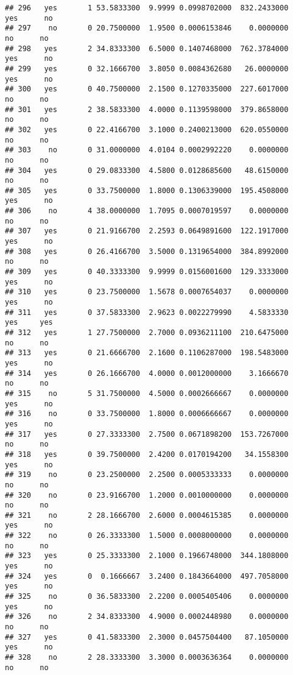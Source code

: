 \documentclass[]{article}
\begin{document}
\begin{verbatim}
## 296   yes       1 53.5833300  9.9999 0.0998702000  832.2433000   yes      no
## 297    no       0 20.7500000  1.9500 0.0006153846    0.0000000    no      no
## 298   yes       2 34.8333300  6.5000 0.1407468000  762.3784000   yes      no
## 299   yes       0 32.1666700  3.8050 0.0084362680   26.0000000   yes      no
## 300   yes       0 40.7500000  2.1500 0.1270335000  227.6017000    no      no
## 301   yes       2 38.5833300  4.0000 0.1139598000  379.8658000    no      no
## 302   yes       0 22.4166700  3.1000 0.2400213000  620.0550000    no      no
## 303    no       0 31.0000000  4.0104 0.0002992220    0.0000000    no      no
## 304   yes       0 29.0833300  4.5800 0.0128685600   48.6150000    no      no
## 305   yes       0 33.7500000  1.8000 0.1306339000  195.4508000   yes      no
## 306    no       4 38.0000000  1.7095 0.0007019597    0.0000000    no      no
## 307   yes       0 21.9166700  2.2593 0.0649891600  122.1917000   yes      no
## 308   yes       0 26.4166700  3.5000 0.1319654000  384.8992000    no      no
## 309   yes       0 40.3333300  9.9999 0.0156001600  129.3333000   yes      no
## 310   yes       0 23.7500000  1.5678 0.0007654037    0.0000000   yes      no
## 311   yes       0 37.5833300  2.9623 0.0022279990    4.5833330   yes     yes
## 312   yes       1 27.7500000  2.7000 0.0936211100  210.6475000    no      no
## 313   yes       0 21.6666700  2.1600 0.1106287000  198.5483000   yes      no
## 314   yes       0 26.1666700  4.0000 0.0012000000    3.1666670    no      no
## 315    no       5 31.7500000  4.5000 0.0002666667    0.0000000   yes      no
## 316    no       0 33.7500000  1.8000 0.0006666667    0.0000000   yes      no
## 317   yes       0 27.3333300  2.7500 0.0671898200  153.7267000    no      no
## 318   yes       0 39.7500000  2.4200 0.0170194200   34.1558300   yes      no
## 319    no       0 23.2500000  2.2500 0.0005333333    0.0000000    no      no
## 320    no       0 23.9166700  1.2000 0.0010000000    0.0000000    no      no
## 321    no       2 28.1666700  2.6000 0.0004615385    0.0000000   yes      no
## 322    no       0 26.3333300  1.5000 0.0008000000    0.0000000    no      no
## 323   yes       0 25.3333300  2.1000 0.1966748000  344.1808000   yes      no
## 324   yes       0  0.1666667  3.2400 0.1843664000  497.7058000   yes      no
## 325    no       0 36.5833300  2.2200 0.0005405406    0.0000000   yes      no
## 326    no       2 34.8333300  4.9000 0.0002448980    0.0000000    no      no
## 327   yes       0 41.5833300  2.3000 0.0457504400   87.1050000   yes      no
## 328    no       2 28.3333300  3.3000 0.0003636364    0.0000000    no      no

\end{verbatim}
\end{document}
